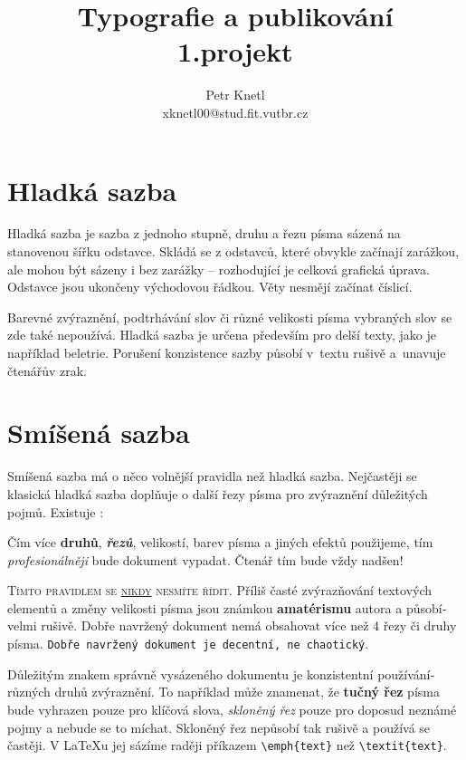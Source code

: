 \documentclass[11pt, a4paper,twocolumn]{article}
\title{Typografie a publikování\\1.projekt}
\author{Petr Knetl\\xknetl00@stud.fit.vutbr.cz}
\date{}
\begin{document}
\maketitle




\section{Hladká sazba}
Hladká sazba je sazba z jednoho stupně, druhu a řezu pí­sma sázená na stanovenou šířku odstavce. Skládá se z odstavců, které obvykle začínají­ zarážkou, ale mohou být sázeny i bez zarážky -- rozhodují­cí­ je celková grafická úprava. Odstavce jsou ukončeny východovou řádkou. Věty nesmějí začínat číslicí.

Barevné zvýraznění­, podtrhávání­ slov či různé velikosti písma vybraných slov se zde také nepoužívá. Hladká sazba je určena především pro delší­ texty, jako je napří­klad beletrie. Porušení­ konzistence sazby působí v~textu rušivě a~unavuje čtenářův zrak.
\section{Smíšená sazba}

Smíšená sazba má o něco volnější­ pravidla než hladká sazba. Nejčastěji se klasická hladká sazba doplňuje o další řezy pí­sma pro zvýraznění­ důležitých pojmů. Existuje :


\begin{changemargin}{0.8cm}{0.8cm} 
Čí­m ví­ce \textbf{druhů}, \textbf{\textit{řezů}},  {\footnotesize velikostí}, barev pí­sma a jiných efektů použijeme, tí­m \textit{profesionálněji} bude  dokument vypadat. Čtenář tím bude vždy  {\Huge nadšen!}
\end{changemargin}
\textsc{Tí­mto pravidlem se \underline{nikdy} nesmí­te ří­dit}. Příliš časté zvýrazňování textových elementů  a změny velikosti pí­sma jsou {\LARGE známkou} {\huge \textbf{amatéris{\-}mu}} autora a působí­ velmi rušivě. Dobře navrže{\-}ný dokument nemá obsahovat ví­ce než 4 řezy či druhy pí­sma. \texttt{Dobře navržený dokument je decentní­, ne chaotický}.

Důležitým znakem správně vysázeného dokumentu je konzistentní použí­vání­ různých druhů zvýraznění­. To napří­klad může znamenat, že \textbf{tučný řez} pí­sma bude vyhrazen pouze pro klíčová slova, \emph{skloněný řez} pouze pro doposud neznámé pojmy a nebude se to míchat. Skloněný řez nepůsobí­ tak rušivě a použí­vá se častěji. V {\LaTeX}u jej sází­me raději pří­kazem \texttt{{\textbackslash}emph\{text\}} než \texttt{{\textbackslash}textit\{text\}}. 
\end{document}

